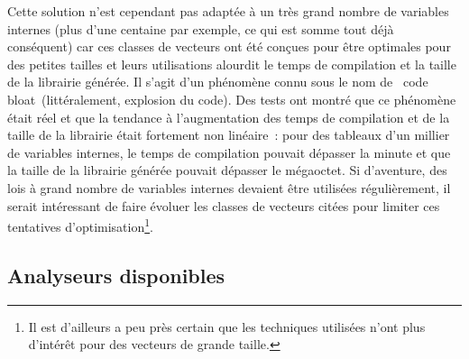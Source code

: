 \documentclass[rectoverso,pleiades,pstricks,leqno,anti]{texmf/note_technique_2010}
\begin{document}
Cette solution n'est cependant pas adaptée à un très grand nombre de
variables internes (plus d'une centaine par exemple, ce qui est somme
tout déjà conséquent) car ces classes de vecteurs ont été conçues pour
être optimales pour des petites tailles et leurs utilisations alourdit
le temps de compilation et la taille de la librairie générée. Il s'agit
d'un phénomène connu sous le nom de \og~code bloat~\fg (littéralement,
explosion du code). Des tests ont montré que ce phénomène était réel et
que la tendance à l'augmentation des temps de compilation et de la
taille de la librairie était fortement non linéaire~: pour des tableaux
d'un millier de variables internes, le temps de compilation pouvait
dépasser la minute et que la taille de la librairie générée pouvait
dépasser le mégaoctet. Si d'aventure, des lois à grand nombre de
variables internes devaient être utilisées régulièrement, il serait
intéressant de faire évoluer les classes de vecteurs citées pour limiter
ces tentatives d'optimisation\footnote{Il est d'ailleurs a peu près
  certain que les techniques utilisées n'ont plus d'intérêt pour des
  vecteurs de grande taille.}.

\subsection{Analyseurs disponibles}
\end{document}
